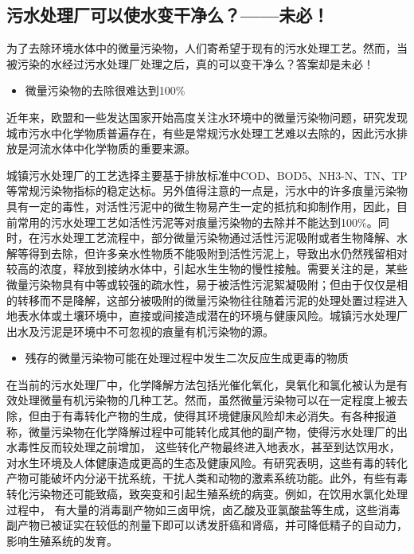 \documentclass[]{book}
\providecommand{\tightlist}{%
  \setlength{\itemsep}{0pt}\setlength{\parskip}{0pt}}
\begin{document}
\subsection{污水处理厂可以使水变干净么？------未必！}

为了去除环境水体中的微量污染物，人们寄希望于现有的污水处理工艺。然而，当被污染的水经过污水处理厂处理之后，真的可以变干净么？答案却是未必！

\begin{itemize}
\tightlist
\item
  微量污染物的去除很难达到100\%
\end{itemize}

近年来，欧盟和一些发达国家开始高度关注水环境中的微量污染物问题，研究发现城市污水中化学物质普遍存在，有些是常规污水处理工艺难以去除的，因此污水排放是河流水体中化学物质的重要来源。

城镇污水处理厂的工艺选择主要基于排放标准中COD、BOD5、NH3-N、TN、TP等常规污染物指标的稳定达标。另外值得注意的一点是，污水中的许多痕量污染物具有一定的毒性，对活性污泥中的微生物易产生一定的抵抗和抑制作用，因此，目前常用的污水处理工艺如活性污泥等对痕量污染物的去除并不能达到100\%。同时，在污水处理工艺流程中，部分微量污染物通过活性污泥吸附或者生物降解、水解等得到去除，但许多亲水性物质不能吸附到活性污泥上，导致出水仍然残留相对较高的浓度，释放到接纳水体中，引起水生生物的慢性接触。需要关注的是，某些微量污染物具有中等或较强的疏水性，易于被活性污泥絮凝吸附；但由于仅仅是相的转移而不是降解，这部分被吸附的微量污染物往往随着污泥的处理处置过程进入地表水体或土壤环境中，直接或间接造成潜在的环境与健康风险。城镇污水处理厂出水及污泥是环境中不可忽视的痕量有机污染物的源。

\begin{itemize}
\tightlist
\item
  残存的微量污染物可能在处理过程中发生二次反应生成更毒的物质
\end{itemize}

在当前的污水处理厂中，化学降解方法包括光催化氧化，臭氧化和氯化被认为是有效处理微量有机污染物的几种工艺。然而，虽然微量污染物可以在一定程度上被去除，但由于有毒转化产物的生成，使得其环境健康风险却未必消失。有各种报道称，微量污染物在化学降解过程中可能转化成其他的副产物，使得污水处理厂的出水毒性反而较处理之前增加，
这些转化产物最终进入地表水，甚至到达饮用水，对水生环境及人体健康造成更高的生态及健康风险。有研究表明，这些有毒的转化产物可能破坏内分泌干扰系统，干扰人类和动物的激素系统功能。此外，有些有毒转化污染物还可能致癌，致突变和引起生殖系统的病变。例如，在饮用水氯化处理过程中，
有大量的消毒副产物如三卤甲烷，卤乙酸及亚氯酸盐等生成，这些消毒副产物已被证实在较低的剂量下即可以诱发肝癌和肾癌，并可降低精子的自动力，影响生殖系统的发育。
\end{document}
